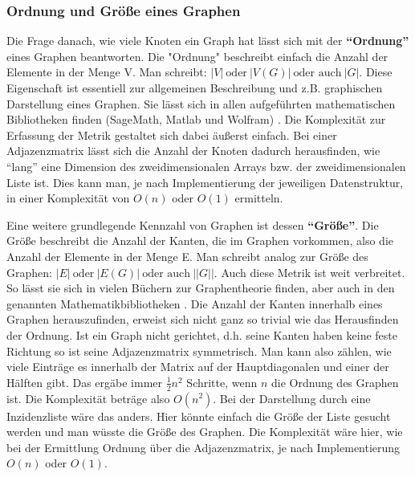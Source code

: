 \documentclass[a4paper,12pt,ngerman,chapterprefix=false,listof=totoc,bibliography=totoc]{scrreprt}
\begin{document}
\subsubsection*{Ordnung und Größe eines Graphen}
{
Die Frage danach, wie viele Knoten ein Graph hat lässt sich mit der \textbf{"`Ordnung"'} eines Graphen beantworten. Die "Ordnung" beschreibt einfach die Anzahl der Elemente in der Menge V. Man schreibt: \(\vert V\vert\ \text{oder}\ \vert V(G)\vert\ \text{oder auch}\ \vert G\vert\). \cite{diestel_graphentheorie_2000} Diese Eigenschaft ist essentiell zur allgemeinen Beschreibung und z.B. graphischen Darstellung eines Graphen. Sie lässt sich in allen aufgeführten mathematischen Bibliotheken finden (SageMath, Matlab und Wolfram) \cite{sagemath_graph_2020,matlab_directed_2020,wolfram_graph_2020}. Die Komplexität zur Erfassung der Metrik gestaltet sich dabei äußerst einfach. Bei einer Adjazenzmatrix lässt sich die Anzahl der Knoten dadurch herausfinden, wie "`lang"' eine Dimension des zweidimensionalen Arrays bzw. der zweidimensionalen Liste ist. Dies kann man, je nach Implementierung der jeweiligen Datenstruktur, in einer Komplexität von \(O(n)\) oder \(O(1)\) ermitteln.

Eine weitere grundlegende Kennzahl von Graphen ist dessen \textbf{"`Größe"'}. Die Größe beschreibt die Anzahl der Kanten, die im Graphen vorkommen, also die Anzahl der Elemente in der Menge E. Man schreibt analog zur Größe des Graphen: \(\vert E\vert\ \text{oder}\ \vert E(G)\vert\ \text{oder auch}\ \vert\vert G \vert\vert\). \cite{balakrishnan_schaums_1997,diestel_graphentheorie_2000} Auch diese Metrik ist weit verbreitet. So lässt sie sich in vielen Büchern zur Graphentheorie finden, aber auch in den genannten Mathematikbibliotheken \cite{sagemath_graph_2020,matlab_directed_2020,wolfram_graph_2020}. Die Anzahl der Kanten innerhalb eines Graphen herauszufinden, erweist sich nicht ganz so trivial wie das Herausfinden der Ordnung. Ist ein Graph nicht gerichtet, d.h. seine Kanten haben keine feste Richtung \cite{diestel_graphentheorie_2000} so ist seine Adjazenzmatrix symmetrisch. Man kann also zählen, wie viele Einträge es innerhalb der Matrix auf der Hauptdiagonalen und einer der Hälften gibt. Das ergäbe immer \(\frac{1}{2}n^2\) Schritte, wenn \(n\) die Ordnung des Graphen ist. Die Komplexität beträge also \(O(n^2)\). Bei der Darstellung durch eine Inzidenzliste wäre das anders. Hier könnte einfach die Größe der Liste gesucht werden und man wüsste die Größe des Graphen. Die Komplexität wäre hier, wie bei der Ermittlung Ordnung über die Adjazenzmatrix, je nach Implementierung \(O(n)\) oder \(O(1)\).
}
\end{document}
